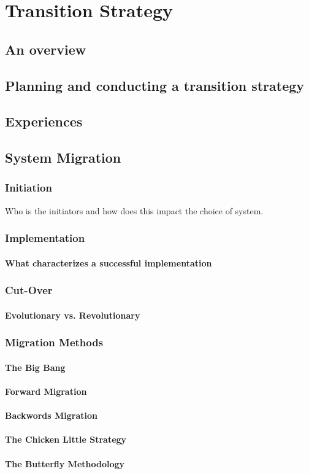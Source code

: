 \chapter{Transition Strategy}
\section{An overview}
\section{Planning and conducting a transition strategy}
\section{Experiences}
\section{System Migration \cite{2} \cite{8}}
\subsection{Initiation}
Who is the initiators and how does this impact the choice of system.
\subsection{Implementation}
\subsubsection{What characterizes a successful implementation}
\subsection{Cut-Over}
\subsubsection{Evolutionary vs. Revolutionary}
\subsection{Migration Methods}
\subsubsection{The Big Bang}
\subsubsection{Forward Migration}
\subsubsection{Backwords Migration}
\subsubsection{The Chicken Little Strategy}
\subsubsection{The Butterfly Methodology}
